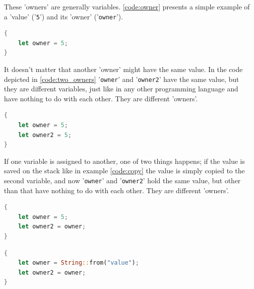 These 'owners' are generally variables. \ref{code:owner} presents a simple example of a 'value' ('\lstinline{5}') and its
'owner' ('\lstinline{owner}').\\

\begin{lstlisting}[style=colorEX,language=Rust,caption={Simple example of a value and it's owner},label={code:owner}]
{
    let owner = 5;
}
\end{lstlisting}

It doesn't matter that another 'owner' might have the same value. In the code depicted in \ref{code:two_owners}
'\lstinline{owner}' and '\lstinline{owner2}' have the same value, but they are different variables, just like in any
other programming language and have nothing to do with each other. They are different 'owners'.\\

\begin{lstlisting}[style=colorEX,language=Rust,caption={Simple example of two owners},label={code:two_owners}]
{
    let owner = 5;
    let owner2 = 5;
}
\end{lstlisting}


If one variable is assigned to another, one of two things happens; if the value is saved on the stack like in
example \ref{code:copy} the value is simply copied to the second variable, and now '\lstinline{owner}' and '\lstinline{owner2}'
hold the same value, but other than that have nothing to do with each other. They are different 'owners'.\\

\begin{lstlisting}[style=colorEX,language=Rust,caption={Simple example of a copy},label={code:copy}]
{
    let owner = 5;
    let owner2 = owner;
}
\end{lstlisting}

\begin{lstlisting}[style=colorEX,language=Rust,caption={Simple example of a move},label={code:move}]
{
    let owner = String::from("value");
    let owner2 = owner;
}
\end{lstlisting}

